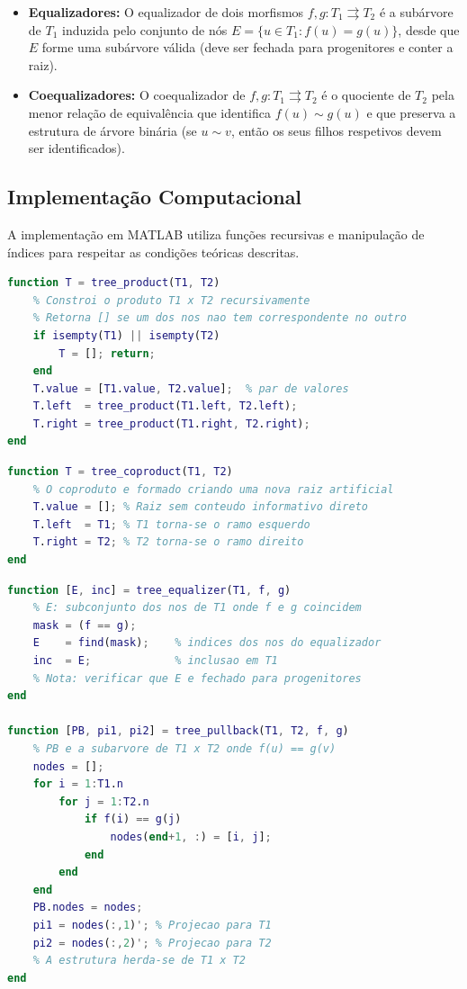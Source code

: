 \begin{itemize}
    \item \textbf{Equalizadores:} O equalizador de dois morfismos $f, g: T_1 \rightrightarrows T_2$ é a subárvore de $T_1$ induzida pelo conjunto de nós $E = \{u \in T_1 : f(u) = g(u)\}$, desde que $E$ forme uma subárvore válida (deve ser fechada para progenitores e conter a raiz).

    \item \textbf{Coequalizadores:} O coequalizador de $f, g: T_1 \rightrightarrows T_2$ é o quociente de $T_2$ pela menor relação de equivalência que identifica $f(u) \sim g(u)$ e que preserva a estrutura de árvore binária (se $u \sim v$, então os seus filhos respetivos devem ser identificados).
\end{itemize}

\subsection{Implementação Computacional}

A implementação em MATLAB utiliza funções recursivas e manipulação de índices para respeitar as condições teóricas descritas.

\begin{lstlisting}[language=Matlab, caption={Produto de duas árvores binárias (representação recursiva)}]
function T = tree_product(T1, T2)
    % Constroi o produto T1 x T2 recursivamente
    % Retorna [] se um dos nos nao tem correspondente no outro
    if isempty(T1) || isempty(T2)
        T = []; return;
    end
    T.value = [T1.value, T2.value];  % par de valores
    T.left  = tree_product(T1.left, T2.left);
    T.right = tree_product(T1.right, T2.right);
end
\end{lstlisting}

\begin{lstlisting}[language=Matlab, caption={Coproduto em Trees (Nova Raiz)}]
function T = tree_coproduct(T1, T2)
    % O coproduto e formado criando uma nova raiz artificial
    T.value = []; % Raiz sem conteudo informativo direto
    T.left  = T1; % T1 torna-se o ramo esquerdo
    T.right = T2; % T2 torna-se o ramo direito
end
\end{lstlisting}

\begin{lstlisting}[language=Matlab, caption={Equalizador e Pullback em Trees}]
function [E, inc] = tree_equalizer(T1, f, g)
    % E: subconjunto dos nos de T1 onde f e g coincidem
    mask = (f == g);
    E    = find(mask);    % indices dos nos do equalizador
    inc  = E;             % inclusao em T1
    % Nota: verificar que E e fechado para progenitores
end

function [PB, pi1, pi2] = tree_pullback(T1, T2, f, g)
    % PB e a subarvore de T1 x T2 onde f(u) == g(v)
    nodes = [];
    for i = 1:T1.n
        for j = 1:T2.n
            if f(i) == g(j)
                nodes(end+1, :) = [i, j];
            end
        end
    end
    PB.nodes = nodes;
    pi1 = nodes(:,1)'; % Projecao para T1
    pi2 = nodes(:,2)'; % Projecao para T2
    % A estrutura herda-se de T1 x T2
end
\end{lstlisting}
